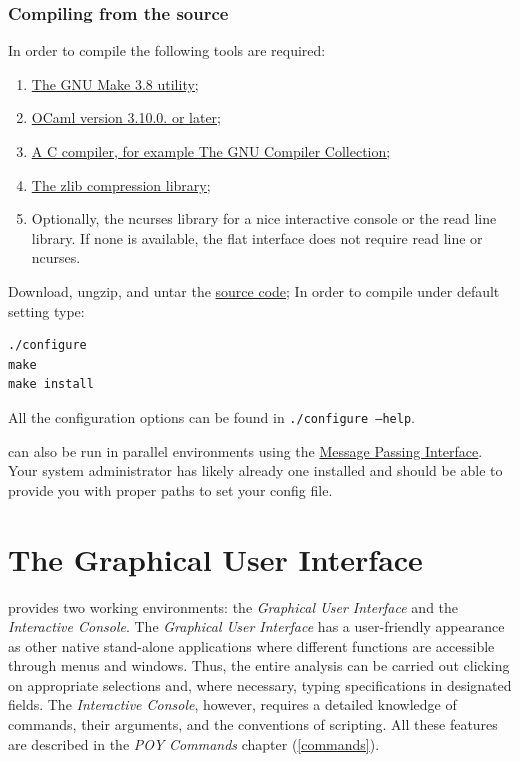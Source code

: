 \subsubsection{Compiling from the source}

In order to compile \poy the following tools are required:

\begin{enumerate}
    \item \href{http://www.gnu.org/software/make/}{The GNU Make 3.8 utility;}
    \item \href{http://www.ocaml.org}{OCaml version 3.10.0. or later;}
    \item \href{http://gcc.gnu.org/}{A C compiler, for example The GNU Compiler Collection;}
    \item \href{http://www.zlib.net}{The zlib compression library;}
    \item Optionally, the ncurses library for a nice interactive console or the read line library. If none is available,
    the flat interface does not require read line or ncurses.
\end{enumerate}

Download, ungzip, and untar the
\href{http://research.amnh.org/scicomp/projects/poy.php}{\poy source code};
In order to compile under default setting type:
\begin{verbatim}
./configure
make
make install
\end{verbatim}
All the configuration options can be found in {\tt ./configure --help}.

\poy can also be run in parallel environments using the
\href{http://www-unix.mcs.anl.gov/mpi/}{Message Passing Interface}. Your system administrator has likely already one installed and should be able to provide you with proper
paths to set your config file.

\section{The Graphical User Interface}

\poy provides two working environments: the \emph{Graphical User Interface} and the \emph{Interactive Console}.  The \emph{Graphical User Interface} has a user-friendly appearance as other native stand-alone applications where different functions are accessible through menus and windows. Thus, the entire analysis can be carried out clicking on appropriate selections and, where necessary, typing specifications in designated fields. The \emph{Interactive Console}, however, requires a detailed knowledge of \poy commands, their arguments, and the conventions of \poy scripting. All these features are described in the \emph{POY Commands} chapter (\ref{commands}).

